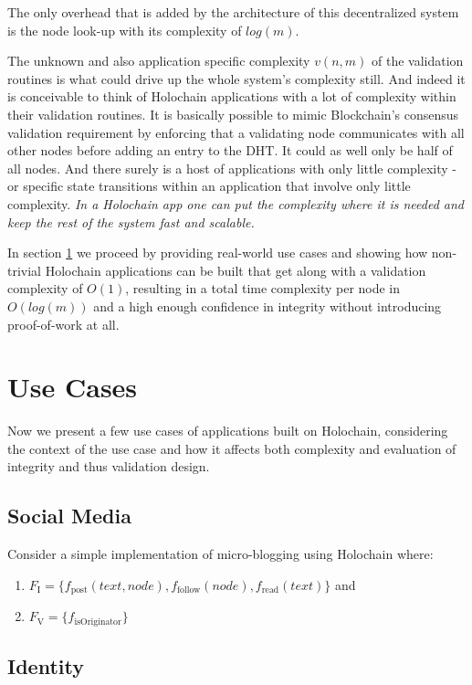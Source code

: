 \documentclass[twocolumn,showpacs,
  nofootinbib,aps,superscriptaddress,
  eqsecnum,prd,notitlepage,showkeys,10pt]{revtex4-1}
\begin{document}
The only overhead that is added by the architecture of this decentralized system is the node look-up with its complexity of $log(m)$.

The unknown and also application specific complexity $v(n,m)$ of the validation routines is what could drive up the whole system's complexity still. And indeed it is conceivable to think of Holochain applications with a lot of complexity within their validation routines. It is basically possible to mimic Blockchain's consensus validation requirement by enforcing that a validating node communicates with all other nodes before adding an entry to the DHT. It could as well only be half of all nodes. And there surely is a host of applications with only little complexity - or specific state transitions within an application that involve only little complexity. \textit{In a Holochain app one can put the complexity where it is needed and keep the rest of the system fast and scalable.}

In section \ref{sec:usecases} we proceed by providing real-world use cases and showing how non-trivial Holochain applications can be built that get along with a validation complexity of $O(1)$, resulting in a total time complexity per node in $O(log(m))$ and a high enough confidence in integrity without introducing proof-of-work at all.

\section{Use Cases}
\label{sec:usecases}

Now we present a few use cases of applications built on Holochain, considering the context of the use case and how it affects both complexity and evaluation of integrity and thus validation design.

\subsection{Social Media}
Consider a simple implementation of micro-blogging using Holochain where:
\begin{enumerate}
\item $F_\mathrm{I}=\{f_\mathrm{post}(text,node),f_\mathrm{follow}(node),f_\mathrm{read}(text)\}$ and

\item $F_\mathrm{V}=\{f_\mathrm{isOriginator}\}$
\end{enumerate}

\subsection{Identity}
\end{document}
